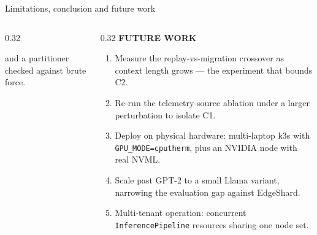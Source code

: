 \documentclass[aspectratio=169,9pt]{beamer}
\newcommand{\kicker}[1]{{\scriptsize\color{keBlue}\bfseries\MakeUppercase{#1}}\par\vspace{0.2em}}
\begin{document}
\begin{frame}[shrink=25]{Limitations, conclusion and future work}
\begin{columns}[T]
\begin{column}{0.32\textwidth}
\begin{itemize}
          and a partitioner checked against brute force.
      \end{itemize}
    \end{column}
    \begin{column}{0.32\textwidth}
      \kicker{Future work}
      \scriptsize
      \begin{enumerate}\setlength\itemsep{0.35em}
        \item Measure the replay-vs-migration crossover as context length grows
          --- the experiment that bounds C2.
        \item Re-run the telemetry-source ablation under a larger perturbation to
          isolate C1.
        \item Deploy on physical hardware: multi-laptop k3s with
          \texttt{GPU\_MODE=cputherm}, plus an NVIDIA node with real NVML.
        \item Scale past GPT-2 to a small Llama variant, narrowing the evaluation
          gap against EdgeShard.
        \item Multi-tenant operation: concurrent \texttt{InferencePipeline}
          resources sharing one node set.
      \end{enumerate}
    \end{column}
  \end{columns}
\end{frame}
\end{document}
